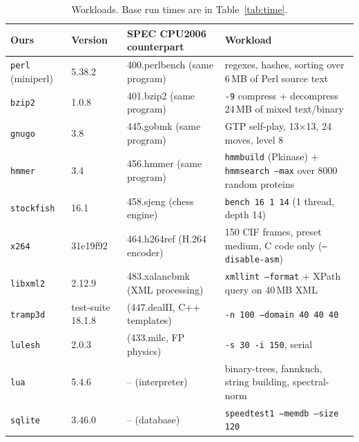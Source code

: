 \documentclass[10pt,a4paper]{article}
\newcommand{\cmd}[1]{\texttt{#1}}
\begin{document}
\begin{table}[t]
\centering\small
\caption{Workloads. Base run times are in Table~\ref{tab:time}.}\label{tab:workloads}
\begin{tabularx}{\linewidth}{lllX}
\toprule
Ours & Version & SPEC CPU2006 counterpart & Workload \\
\midrule
\cmd{perl} (miniperl) & 5.38.2 & 400.perlbench (same program) & regexes, hashes, sorting over 6\,MB of Perl source text \\
\cmd{bzip2} & 1.0.8 & 401.bzip2 (same program) & \cmd{-9} compress + decompress 24\,MB of mixed text/binary \\
\cmd{gnugo} & 3.8 & 445.gobmk (same program) & GTP self-play, 13$\times$13, 24 moves, level 8 \\
\cmd{hmmer} & 3.4 & 456.hmmer (same program) & \cmd{hmmbuild} (Pkinase) + \cmd{hmmsearch --max} over 8000 random proteins \\
\cmd{stockfish} & 16.1 & 458.sjeng (chess engine) & \cmd{bench 16 1 14} (1 thread, depth 14) \\
\cmd{x264} & 31e19f92 & 464.h264ref (H.264 encoder) & 150 CIF frames, preset medium, C code only (\cmd{--disable-asm}) \\
\cmd{libxml2} & 2.12.9 & 483.xalancbmk (XML processing) & \cmd{xmllint --format} + XPath query on 40\,MB XML \\
\cmd{tramp3d} & test-suite 18.1.8 & (447.dealII, C++ templates) & \cmd{-n 100 --domain 40 40 40} \\
\cmd{lulesh} & 2.0.3 & (433.milc, FP physics) & \cmd{-s 30 -i 150}, serial \\
\cmd{lua} & 5.4.6 & -- (interpreter) & binary-trees, fannkuch, string building, spectral-norm \\
\cmd{sqlite} & 3.46.0 & -- (database) & \cmd{speedtest1 --memdb --size 120} \\
\bottomrule
\end{tabularx}
\end{table}
\end{document}
